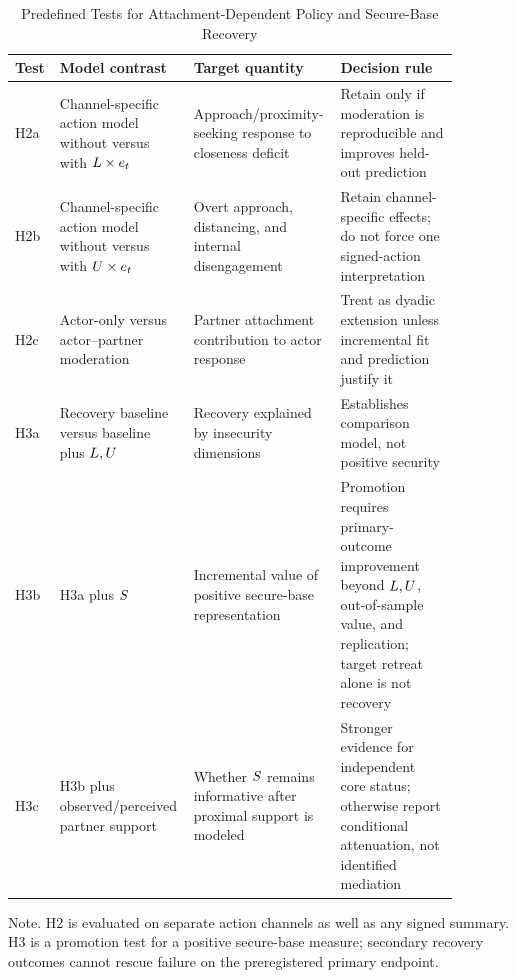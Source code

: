\begin{table}[htbp]
\caption{Predefined Tests for Attachment-Dependent Policy and Secure-Base Recovery}
\label{tab:h2-h3-tests}
\centering
\scriptsize
\setlength{\tabcolsep}{2pt}
\renewcommand{\arraystretch}{0.85}
\begin{threeparttable}
\begin{tabular}{p{0.09\linewidth}p{0.26\linewidth}p{0.27\linewidth}p{0.26\linewidth}}
\toprule
Test & Model contrast & Target quantity & Decision rule \\
\midrule
H2a & Channel-specific action model without versus with \(L \times e_t\) & Approach/proximity-seeking response to closeness deficit & Retain only if moderation is reproducible and improves held-out prediction \\
H2b & Channel-specific action model without versus with \(U \times e_t\) & Overt approach, distancing, and internal disengagement & Retain channel-specific effects; do not force one signed-action interpretation \\
H2c & Actor-only versus actor--partner moderation & Partner attachment contribution to actor response & Treat as dyadic extension unless incremental fit and prediction justify it \\
H3a & Recovery baseline versus baseline plus \(L,U\) & Recovery explained by insecurity dimensions & Establishes comparison model, not positive security \\
H3b & H3a plus \(S\) & Incremental value of positive secure-base representation & Promotion requires primary-outcome improvement beyond \(L,U\), out-of-sample value, and replication; target retreat alone is not recovery \\
H3c & H3b plus observed/perceived partner support & Whether \(S\) remains informative after proximal support is modeled & Stronger evidence for independent core status; otherwise report conditional attenuation, not identified mediation \\
\bottomrule
\end{tabular}
\begin{tablenotes}[flushleft]
\footnotesize
\item Note. H2 is evaluated on separate action channels as well as any signed summary. H3 is a promotion test for a positive secure-base measure; secondary recovery outcomes cannot rescue failure on the preregistered primary endpoint.
\end{tablenotes}
\end{threeparttable}
\end{table}
